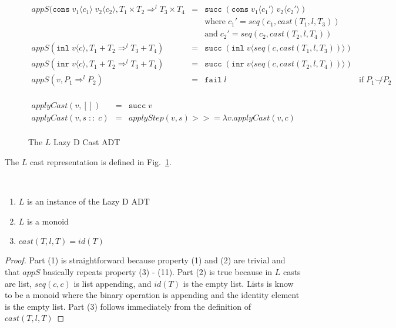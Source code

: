 \documentclass[acmsmall,review,anonymous]{acmart}\settopmatter{printfolios=true,printccs=false,printacmref=false}
\newcommand{\figref}[1]{Fig.~\ref{#1}}
\newcommand{\funrule}[3]{#1 &=& #2 & #3\\}
\newcommand{\plus}[0]{+}
\newcommand{\POOprod}[2]{#1 \times #2}
\newcommand{\POOsum}[2]{#1 \plus #2}
\newcommand{\cOOcast}[3]{#1 \Rightarrow^{#2} #3}
\newcommand{\rOOsucc}[1]{\mathtt{succ}\;#1}
\newcommand{\rOOfail}[1]{\mathtt{fail}\;#1}
\newcommand{\hcvOOcons}[4]{\mathtt{cons}\;#1\langle#2\rangle\;#3\langle#4\rangle}
\newcommand{\hcvOOinl}[2]{\mathtt{inl}\;#1\langle#2\rangle}
\newcommand{\hcvOOinr}[2]{\mathtt{inr}\;#1\langle#2\rangle}
\newcommand{\sidecond}[1]{\text{if}\;#1}
\newcommand{\lsOOcast}[3]{\cOOcast{#1}{#2}{#3}}
\newcommand{\lcOOnull}[0]{[]}
\newcommand{\lcOOcons}[2]{#1 \; :: \; #2}
\begin{document}
\begin{figure}
\[\begin{array}{rclr}
\funrule{
  appS(
    \hcvOOcons{v_1}{c_1}{v_2}{c_2},
    \lsOOcast{\POOprod{T_1}{T_2}}{l}{\POOprod{T_3}{T_4}}
}{
  \rOOsucc{(\hcvOOcons{v_1}{c_1'}{v_2}{c_2'})}
}{
\\ &&
\text{where} \;
c_1' = seq(c_1,cast(T_1,l,T_3))
\\ &&
\text{and} \;
c_2' = seq(c_2,cast(T_2,l,T_4))
}
\funrule{
  appS(\hcvOOinl{v}{c},\lsOOcast{\POOsum{T_1}{T_2}}{l}{\POOsum{T_3}{T_4}})
}{
  \rOOsucc{(\hcvOOinl{v}{seq(c,cast(T_1,l,T_3))})}
}{}
\funrule{
  appS(\hcvOOinr{v}{c},\lsOOcast{\POOsum{T_1}{T_2}}{l}{\POOsum{T_3}{T_4}})
}{
  \rOOsucc{(\hcvOOinr{v}{seq(c,cast(T_2,l,T_4))})}
}{}
\funrule{
  appS(v,\cOOcast{P_1}{l}{P_2})
}{
  \rOOfail{l}
}{\sidecond{P_1 \not\smile P_2}}

\end{array}
\]


\[
\begin{array}{rclr}
\funrule{
  applyCast(v,\lcOOnull)
}{
  \rOOsucc{v}
}{}
\funrule{
  applyCast(v,\lcOOcons{s}{c})
}{
  applyStep(v,s) >>= \lambda v. applyCast(v,c)
}{}
\end{array}
\]

\caption{The $L$ Lazy D Cast ADT}
\label{fig:L-instance-LazyD}
\end{figure}

The $L$ cast representation is defined in
\figref{fig:L-instance-LazyD}.



\begin{proposition}[$L$ properties]\label{thm:L-LazyD-monoid}\ 
  \begin{enumerate}
  \item $L$ is an instance of the Lazy D ADT
  \item $L$ is a monoid
  \item $cast(T,l,T) = id(T)$
  \end{enumerate}
\end{proposition}
\begin{proof}
  Part (1) is straightforward because property (1) and (2) are trivial and 
  that $appS$ basically repeats property (3) - (11).
  Part (2) is true because in $L$ casts are list, $seq(c,c)$ is list 
  appending, and $id(T)$ is the empty list. Lists is know to be a monoid 
  where the binary operation is appending and the identity element is the 
  empty list.
  Part (3) follows immediately from the definition of $cast(T,l,T)$
\end{proof}
\end{document}
